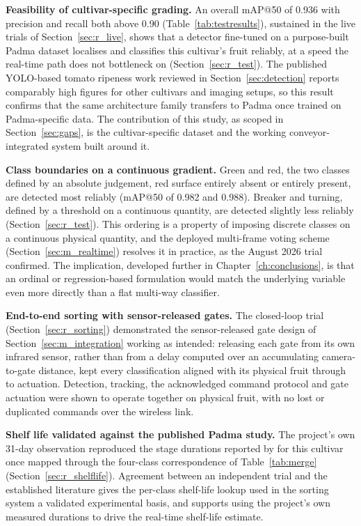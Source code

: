 \textbf{Feasibility of cultivar-specific grading.} An overall mAP@50 of 0.936 with precision and recall both above 0.90 (Table~\ref{tab:testresults}), sustained in the live trials of Section~\ref{sec:r_live}, shows that a detector fine-tuned on a purpose-built Padma dataset localises and classifies this cultivar's fruit reliably, at a speed the real-time path does not bottleneck on (Section~\ref{sec:r_test}). The published YOLO-based tomato ripeness work reviewed in Section~\ref{sec:detection} reports comparably high figures for other cultivars and imaging setups, so this result confirms that the same architecture family transfers to Padma once trained on Padma-specific data. The contribution of this study, as scoped in Section~\ref{sec:gaps}, is the cultivar-specific dataset and the working conveyor-integrated system built around it.

\textbf{Class boundaries on a continuous gradient.} Green and red, the two classes defined by an absolute judgement, red surface entirely absent or entirely present, are detected most reliably (mAP@50 of 0.982 and 0.988). Breaker and turning, defined by a threshold on a continuous quantity, are detected slightly less reliably (Section~\ref{sec:r_test}). This ordering is a property of imposing discrete classes on a continuous physical quantity, and the deployed multi-frame voting scheme (Section~\ref{sec:m_realtime}) resolves it in practice, as the August 2026 trial confirmed. The implication, developed further in Chapter~\ref{ch:conclusions}, is that an ordinal or regression-based formulation would match the underlying variable even more directly than a flat multi-way classifier.

\textbf{End-to-end sorting with sensor-released gates.} The closed-loop trial (Section~\ref{sec:r_sorting}) demonstrated the sensor-released gate design of Section~\ref{sec:m_integration} working as intended: releasing each gate from its own infrared sensor, rather than from a delay computed over an accumulating camera-to-gate distance, kept every classification aligned with its physical fruit through to actuation. Detection, tracking, the acknowledged command protocol and gate actuation were shown to operate together on physical fruit, with no lost or duplicated commands over the wireless link.

\textbf{Shelf life validated against the published Padma study.} The project's own 31-day observation reproduced the stage durations reported by \citet{abekoon2024} for this cultivar once mapped through the four-class correspondence of Table~\ref{tab:merge} (Section~\ref{sec:r_shelflife}). Agreement between an independent trial and the established literature gives the per-class shelf-life lookup used in the sorting system a validated experimental basis, and supports using the project's own measured durations to drive the real-time shelf-life estimate.

